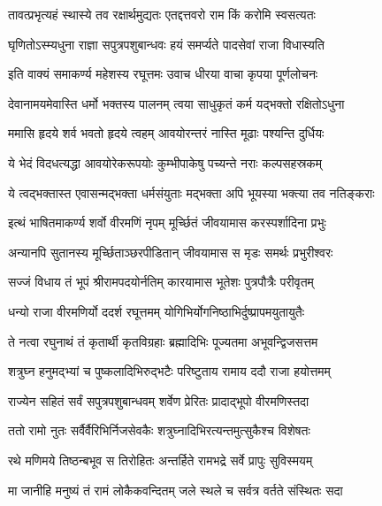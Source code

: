 \twolineshloka
{तावत्प्रभृत्यहं स्थास्ये तव रक्षार्थमुद्यतः}
{एतद्दत्तवरो राम किं करोमि स्वसत्यतः}%

\twolineshloka
{घृणितोऽस्म्यधुना राज्ञा सपुत्रपशुबान्धवः}
{हयं समर्प्यते पादसेवां राजा विधास्यति}%


\twolineshloka
{इति वाक्यं समाकर्ण्य महेशस्य रघूत्तमः}
{उवाच धीरया वाचा कृपया पूर्णलोचनः}%


\twolineshloka
{देवानामयमेवास्ति धर्मो भक्तस्य पालनम्}
{त्वया साधुकृतं कर्म यद्भक्तो रक्षितोऽधुना}%

\twolineshloka
{ममासि हृदये शर्व भवतो हृदये त्वहम्}
{आवयोरन्तरं नास्ति मूढाः पश्यन्ति दुर्धियः}%

\twolineshloka
{ये भेदं विदधत्यद्धा आवयोरेकरूपयोः}
{कुम्भीपाकेषु पच्यन्ते नराः कल्पसहस्रकम्}%

\twolineshloka
{ये त्वद्भक्तास्त एवासन्मद्भक्ता धर्मसंयुताः}
{मद्भक्ता अपि भूयस्या भक्त्या तव नतिङ्कराः}%


\twolineshloka
{इत्थं भाषितमाकर्ण्य शर्वो वीरमणिं नृपम्}
{मूर्च्छितं जीवयामास करस्पर्शादिना प्रभुः}%

\twolineshloka
{अन्यानपि सुतानस्य मूर्च्छिताञ्छरपीडितान्}
{जीवयामास स मृडः समर्थः प्रभुरीश्वरः}%

\twolineshloka
{सज्जं विधाय तं भूपं श्रीरामपदयोर्नतिम्}
{कारयामास भूतेशः पुत्रपौत्रैः परीवृतम्}%

\twolineshloka
{धन्यो राजा वीरमणिर्यो ददर्श रघूत्तमम्}
{योगिभिर्योगनिष्ठाभिर्दुष्प्रापमयुतायुतैः}%

\twolineshloka
{ते नत्वा रघुनाथं तं कृतार्थी कृतविग्रहाः}
{ब्रह्मादिभिः पूज्यतमा अभूवन्द्विजसत्तम}%

\twolineshloka
{शत्रुघ्न हनुमद्भ्यां च पुष्कलादिभिरुद्भटैः}
{परिष्टुताय रामाय ददौ राजा हयोत्तमम्}%

\twolineshloka
{राज्येन सहितं सर्वं सपुत्रपशुबान्धवम्}
{शर्वेण प्रेरितः प्रादाद्भूपो वीरमणिस्तदा}%

\twolineshloka
{ततो रामो नुतः सर्वैर्वैरिभिर्निजसेवकैः}
{शत्रुघ्नादिभिरत्यन्तमुत्सुकैश्च विशेषतः}%

\twolineshloka
{रथे मणिमये तिष्ठन्बभूव स तिरोहितः}
{अन्तर्हिते रामभद्रे सर्वे प्रापुः सुविस्मयम्}%

\twolineshloka
{मा जानीहि मनुष्यं तं रामं लोकैकवन्दितम्}
{जले स्थले च सर्वत्र वर्तते संस्थितः सदा}%

